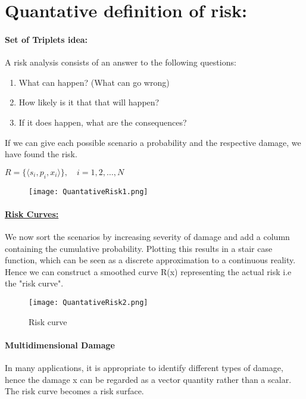 \documentclass[8pt]{extreport}
\begin{document}
{\section{\large{Quantative definition of risk:}}
\paragraph{Set of Triplets idea:} A risk analysis consists of an answer to the following questions:

\begin{enumerate}[label = (\roman*)]
\item What can happen? (What can go wrong)
\item How likely is it that that will happen?
\item If it does happen, what are the consequences?
\end{enumerate}
If we can give each possible scenario a probability and the respective damage, we have found the risk.
\begin{center}
$R = \{ \langle s_i, p_i, x_i \rangle \}, \quad i = 1,2, \dots , N$
\end{center}

\begin{figure}[h!]
  \centering\texttt{[image: QuantativeRisk1.png]}
  \caption{}
  \label{scenarioList}
\end{figure}
\paragraph{\underline{Risk Curves:}} \small{We now sort the scenarios by increasing severity of damage and add a column containing the cumulative probability. Plotting this results in a stair case function, which can be seen as a discrete approximation to a continuous reality. Hence we can construct a smoothed curve R(x) representing the actual risk i.e the "risk curve".}
\begin{figure}[h!]
  \centering\texttt{[image: QuantativeRisk2.png]}
  \caption{\footnotesize{Risk curve}}
  \label{scenarioList}
\end{figure}
\paragraph{Multidimensional Damage} \small{In many applications, it is appropriate to identify different types of damage, hence the damage x can be regarded as a vector quantity rather than a scalar. The risk curve becomes a risk surface.
}}
\end{document}
